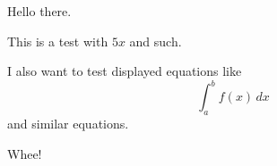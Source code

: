 \documentclass{article}
\begin{document}
Hello there.

This is a test with $5x$ and such.

\begin{question}
I also want to test displayed equations like
$$\int_a^b f(x) \, dx$$
and similar equations.

\begin{solution}
Whee!
\end{solution}

\end{question}

\end{document}
